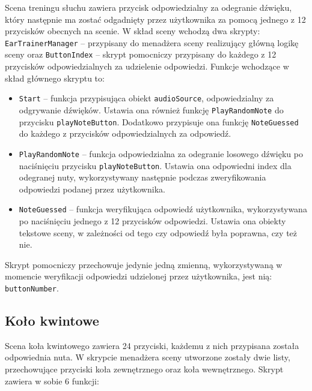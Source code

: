 Scena treningu słuchu zawiera przycisk odpowiedzialny za odegranie dźwięku, który następnie ma zostać odgadnięty przez użytkownika za pomocą jednego z 12 przycisków obecnych na scenie. W skład sceny wchodzą dwa skrypty: \texttt{EarTrainerManager} -- przypisany do menadżera sceny realizujący główną logikę sceny oraz \texttt{ButtonIndex} -- skrypt pomocniczy przypisany do każdego z 12 przycisków odpowiedzialnych za udzielenie odpowiedzi. Funkcje wchodzące w skład głównego skryptu to:
\begin{itemize}
    \item \texttt{Start} -- funkcja przypisująca obiekt \texttt{audioSource}, odpowiedzialny za odgrywanie dźwięków. Ustawia ona również funkcję \texttt{PlayRandomNote} do przycisku \texttt{playNoteButton}. Dodatkowo przypisuje ona funkcję \texttt{NoteGuessed} do każdego z przycisków odpowiedzialnych za odpowiedź.
    \item \texttt{PlayRandomNote} -- funkcja odpowiedzialna za odegranie losowego dźwięku po naciśnięciu przycisku \texttt{playNoteButton}. Ustawia ona odpowiedni index dla odegranej nuty, wykorzystywany następnie podczas zweryfikowania odpowiedzi podanej przez użytkownika.
    \item \texttt{NoteGuessed} -- funkcja weryfikująca odpowiedź użytkownika, wykorzystywana po naciśnięciu jednego z 12 przycisków odpowiedzi. Ustawia ona obiekty tekstowe sceny, w zależności od tego czy odpowiedź była poprawna, czy też nie. 
\end{itemize}

Skrypt pomocniczy przechowuje jedynie jedną zmienną, wykorzystywaną w momencie weryfikacji odpowiedzi udzielonej przez użytkownika, jest nią: \texttt{buttonNumber}.

\subsection{Koło kwintowe}

Scena koła kwintowego zawiera 24 przyciski, każdemu z nich przypisana została odpowiednia nuta. W skrypcie menadżera sceny utworzone zostały dwie listy, przechowujące przyciski koła zewnętrznego oraz koła wewnętrznego. Skrypt zawiera w sobie 6 funkcji:

